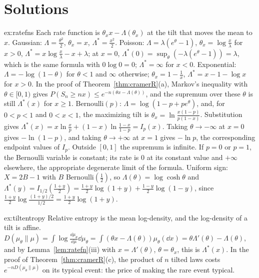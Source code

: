 \section{Solutions}

\begin{solution}{ex:ratefns}
\idea Each rate function is $\theta_xx-\Lambda(\theta_x)$ at the tilt that moves the mean to $x$.
\writeup Gaussian: $\Lambda=\frac{\theta^2}2$, $\theta_x=x$, $\Lambda^*=\frac{x^2}2$. Poisson: $\Lambda=\lambda(e^\theta-1)$, $\theta_x=\log\frac x\lambda$ for $x>0$, $\Lambda^*=x\log\frac x\lambda-x+\lambda$; at
$x=0$, $\Lambda^*(0)=\sup_\theta(-\lambda(e^\theta-1))=\lambda$, which is the same formula with $0\log0=0$; $\Lambda^*=\infty$ for $x<0$. Exponential: $\Lambda=-\log(1-\theta)$ for $\theta<1$ and $\infty$
otherwise; $\theta_x=1-\frac1x$, $\Lambda^*=x-1-\log x$ for $x>0$. In the proof of Theorem~\ref{thm:cramerR}(a), Markov's inequality with $\theta\in[0,1)$ gives
$P(S_n\ge nx)\le e^{-n(\theta x-\Lambda(\theta))}$, and the supremum over these $\theta$ is still $\Lambda^*(x)$ for $x\ge1$. Bernoulli$(p)$: $\Lambda=\log(1-p+pe^\theta)$, and, for $0<p<1$ and $0<x<1$, the maximizing tilt is $\theta_x=\ln\frac{x(1-p)}{p(1-x)}$. Substitution gives $\Lambda^*(x)=x\ln\frac{x}{p}+(1-x)\ln\frac{1-x}{1-p}=I_p(x)$. Taking $\theta\to-\infty$ at $x=0$ gives $-\ln(1-p)$, and taking $\theta\to+\infty$ at $x=1$ gives $-\ln p$, the corresponding endpoint values of $I_p$. Outside $[0,1]$ the supremum is infinite. If $p=0$ or $p=1$, the Bernoulli variable is constant; its rate is $0$ at its constant value and $+\infty$ elsewhere, the appropriate degenerate limit of the formula. Uniform sign: $X=2B-1$ with $B$ Bernoulli$(\frac12)$, so $\Lambda(\theta)=\log\cosh\theta$ and
$\Lambda^*(y)=I_{1/2}(\frac{1+y}2)=\frac{1+y}2\log(1+y)+\frac{1-y}2\log(1-y)$, since $\frac{1+y}2\log\frac{(1+y)/2}{1/2}=\frac{1+y}2\log(1+y)$.
\end{solution}

\begin{solution}{ex:tiltentropy}
\idea Relative entropy is the mean log-density, and the log-density of a tilt is affine.
\writeup $D(\mu_\theta\|\mu)=\int\log\frac{\dd\mu_\theta}{\dd\mu}\dd\mu_\theta=\int(\theta x-\Lambda(\theta))\mu_\theta(\dd x)=\theta\Lambda'(\theta)-\Lambda(\theta)$, and by Lemma~\ref{lem:ratefn}(iii) with
$x=\Lambda'(\theta)$, $\theta=\theta_x$, this is $\Lambda^*(x)$. In the proof of Theorem~\ref{thm:cramerR}(c), the product of $n$ tilted laws costs $e^{-nD(\mu_\theta\|\mu)}$ on its typical
event: the price of making the rare event typical.
\end{solution}

